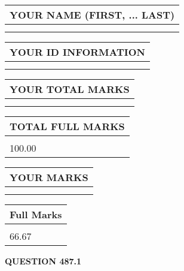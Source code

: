 \documentclass{ctexart}
\begin{document}
   
   
   
\newpage 
\setcounter{page}{ 
   487001 } 
   
   
   
   
\noindent\begin{tabular}{|l|}
\hline
YOUR NAME (FIRST, ... LAST)  \\
\hline
 \\ 
 \\ 
\hline
\end{tabular}
\hspace{0.05in} \begin{tabular}{|l|}
\hline
 YOUR   ID   INFORMATION  \\
\hline
 \\ 
 \\ 
\hline
\end{tabular}
   
   
\vspace{0.2in}\noindent\begin{tabular}{|l|}
\hline
YOUR TOTAL MARKS  \\
\hline
 \\ 
 \\ 
\hline
\end{tabular}
\hspace{0.05in} \begin{tabular}{|l|}
\hline
TOTAL FULL MARKS  \\
\hline
 \\ 
100.00 \\
\hline
\end{tabular}
   
   
 \vspace{0.2in}
 
 
 
 
   
   
  
\vspace{0.2in}
  
\noindent\begin{tabular}{|l|}
\hline
 YOUR MARKS  \\
\hline
 \\ 
 \\ 
\hline
\end{tabular}
\hspace{0.05in} \begin{tabular}{|l|}
\hline
 Full Marks  \\
\hline
 \\ 
66.67 \\
\hline
\end{tabular}
{\textbf{\Large{QUESTION
487.1 
}}}
  
\end{document}
